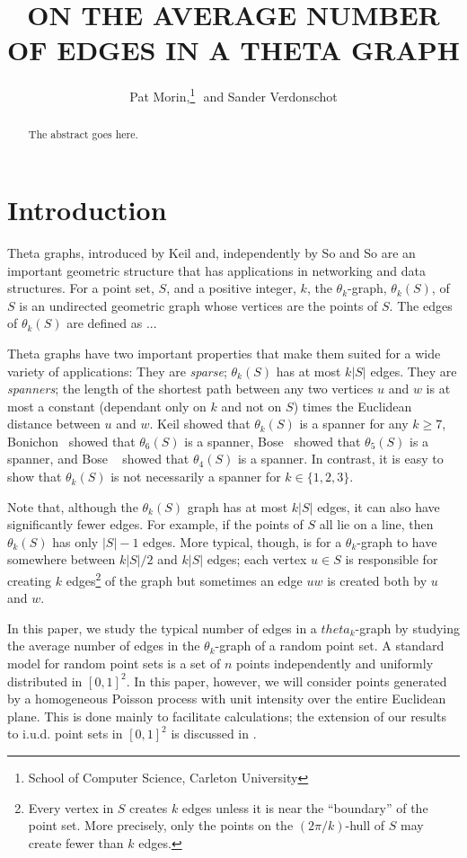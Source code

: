 \documentclass{patmorin}
\title{\MakeUppercase{On the Average Number of Edges in a Theta Graph}}
\author{Pat Morin,\thanks{School of Computer Science, Carleton University}\,\,
         and Sander Verdonschot\footnotemark[1]}
\begin{document}
\maketitle

\begin{abstract}
  The abstract goes here.
\end{abstract}

\section{Introduction}

Theta graphs, introduced by Keil \cite{A} and, independently by So and
So \cite{} are an important geometric structure that has applications
in networking \cite{A} and data structures.  For a point set, $S$, and
a positive integer, $k$, the $\theta_k$-graph, $\theta_k(S)$, of $S$
is an undirected geometric graph whose vertices are the points of $S$.
The edges of $\theta_k(S)$ are defined as ...

Theta graphs have two important properties that make them suited for
a wide variety of applications:  They are \emph{sparse}; $\theta_k(S)$
has at most $k|S|$ edges.  They are \emph{spanners}; the length of the
shortest path between any two vertices $u$ and $w$ is at most a constant
(dependant only on $k$ and not on $S$) times the Euclidean distance
between $u$ and $w$.  Keil \cite{kXX} showed that $\theta_k(S)$ is a
spanner for any $k\ge 7$, Bonichon \etal\ showed that $\theta_6(S)$
is a spanner,  Bose \etal\ showed that $\theta_5(S)$ is a spanner,
and Bose \etal\ \cite{bXX} showed that $\theta_4(S)$ is a spanner.
In contrast, it is easy to show that $\theta_k(S)$ is not necessarily
a spanner for $k\in\{1,2,3\}$.

Note that, although the $\theta_k(S)$ graph has at most $k|S|$ edges,
it can also have significantly fewer edges.  For example, if the points
of $S$ all lie on a line, then $\theta_k(S)$ has only $|S|-1$ edges.
More typical, though, is for a $\theta_k$-graph to have somewhere
between $k|S|/2$ and $k|S|$ edges;  each vertex $u\in S$ is responsible
for creating $k$ edges\footnote{Every vertex in $S$ creates $k$ edges
unless it is near the ``boundary'' of the point set.  More precisely,
only the points on the $(2\pi/k)$-hull \cite{alpha-hull} of $S$ may
create fewer than $k$ edges.} of the graph but sometimes an edge $uw$
is created both by $u$ and $w$.

In this paper, we study the typical number of edges in a $theta_k$-graph
by studying the average number of edges in the $\theta_k$-graph of a
random point set.  A standard model for random point sets is a set of $n$
points independently and uniformly distributed in $[0,1]^2$.  In this
paper, however, we will consider points generated by a homogeneous Poisson
process with unit intensity over the entire Euclidean plane.  This is
done mainly to facilitate calculations; the extension of our results to
i.u.d. point sets in $[0,1]^2$ is discussed in .
\end{document}
